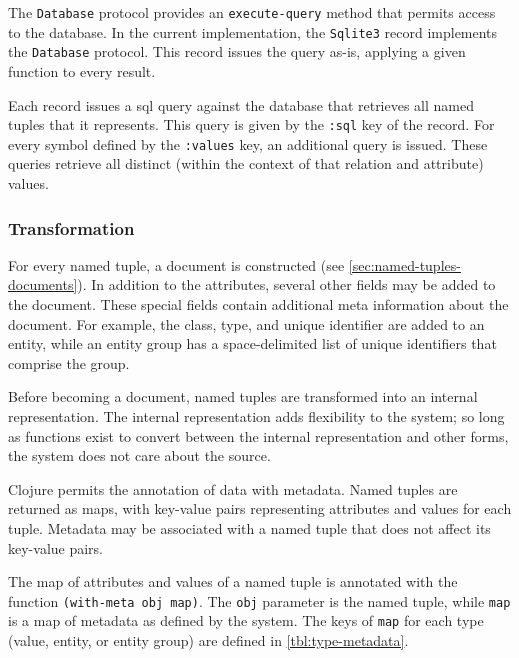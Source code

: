 			The \texttt{Database} protocol provides an \texttt{execute-query} method that permits access to the database.  In the current implementation, the \texttt{Sqlite3} record implements the \texttt{Database} protocol.  This record issues the query as-is, applying a given function to every result.
			
			Each record issues a \gls{sql} query against the database that retrieves all named tuples that it represents.  This query is given by the \texttt{:sql} key of the record.  For every symbol defined by the \texttt{:values} key, an additional query is issued.  These queries retrieve all distinct (within the context of that relation and attribute) values.
		
		\subsubsection{Transformation}
			For every named tuple, a document is constructed (see \cref{sec:named-tuples-documents}).  In addition to the attributes, several other fields may be added to the document.  These special fields contain additional meta information about the document.  For example, the class, type, and unique identifier are added to an entity, while an entity group has a space-delimited list of unique identifiers that comprise the group.
			
			Before becoming a document, named tuples are transformed into an internal representation.  The internal representation adds flexibility to the system; so long as functions exist to convert between the internal representation and other forms, the system does not care about the source.
			
			Clojure permits the annotation of data with metadata.  Named tuples are returned as maps, with key-value pairs representing attributes and values for each tuple.  Metadata may be associated with a named tuple that does not affect its key-value pairs.
			
			The map of attributes and values of a named tuple is annotated with the function \texttt{(with-meta obj map)}.  The \texttt{obj} parameter is the named tuple, while \texttt{map} is a map of metadata as defined by the system.  The keys of \texttt{map} for each type (value, entity, or entity group) are defined in \vref{tbl:type-metadata}.
			
